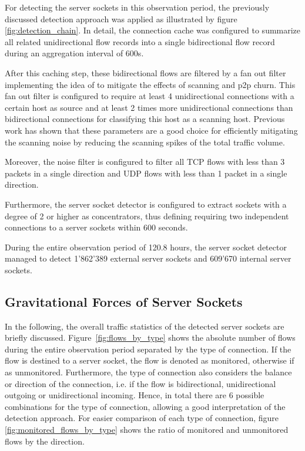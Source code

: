 For detecting the server sockets in this observation period, the previously 
discussed detection approach was applied as illustrated by figure 
\ref{fig:detection_chain}. In detail, the connection cache was configured to 
summarize all related unidirectional flow records into a single bidirectional 
flow record during an aggregation interval of 600s. 

After this caching step, these bidirectional flows are filtered by a fan out 
filter implementing the idea of \citet{Allman:2007} to mitigate the effects of 
scanning and p2p churn. This fan out filter is configured to require at least 4 
unidirectional connections with a certain host as source and at least 2 times 
more unidirectional connections than bidirectional connections for classifying 
this host as a scanning host. Previous 
work\citep{Schatzmann:Mining,Schatzmann:Dissection, Schatzmann:Tracing} has 
shown that these parameters are a good choice for efficiently mitigating the 
scanning noise by reducing the scanning spikes of the total traffic volume. 

Moreover, the noise filter is configured to filter all TCP flows with less than 
3 packets in a single direction and UDP flows with less than 1 packet in a 
single direction. 

Furthermore, the server socket detector is configured to extract sockets with a 
degree of 2 or higher as concentrators, thus defining requiring two independent 
connections to a server sockets within 600 seconds. 

During the entire observation period of 120.8 hours, the server socket detector 
managed to detect 1'862'389 external server sockets and 609'670 internal server 
sockets.

\subsection{Gravitational Forces of Server Sockets}
In the following, the overall traffic statistics of the detected server sockets 
are briefly discussed. Figure \ref{fig:flows_by_type} shows the absolute number 
of flows during the entire observation period separated by the type of 
connection. If the flow is destined to a server socket, the flow is denoted as 
monitored, otherwise if as unmonitored. Furthermore, the type of connection also 
considers the balance or direction of the connection, i.e. if the flow is 
bidirectional, unidirectional outgoing or unidirectional incoming. Hence, in 
total there are 6 possible combinations for the type of connection, allowing a 
good interpretation of the detection approach. For easier comparison of each 
type of connection, figure \ref{fig:monitored_flows_by_type} shows the ratio of 
monitored and unmonitored flows by the direction.

